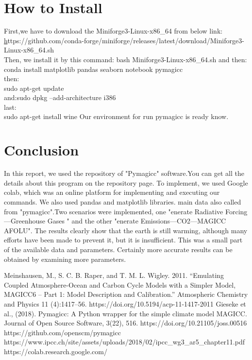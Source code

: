 \documentclass{article}
\begin{document}
\section{How to Install}
First,we have to download the Miniforge3-Linux-x86\_64 from below link:\\

\href{https://github.com/conda-forge/miniforge/releases/latest/download/Miniforge3-Linux-x86_64.sh}https://github.com/conda-forge/miniforge/releases/latest/download/Miniforge3-Linux-x86\_64.sh\\

Then, we install it by this command: 
bash Miniforge3-Linux-x86\_64.sh  and then:\\

conda install matplotlib pandas seaborn notebook pymagicc\\

then:\\

sudo apt-get update \\

and:sudo dpkg --add-architecture i386\\

 last:\\
 sudo apt-get install wine
 Our environment for run pymagicc is ready know.\\
\vspace{1cm} 
\section{Conclusion}
In this report, we used the repository of "Pymagicc" software\cite{3}.You can get all the details about this program on the repository page. To implement, we used Google colab\cite{5}, which was an online platform for implementing and executing our commands. We also used pandas and matplotlib libraries. main data also called from "pymagicc".Two scenarios were implemented, one "enerate Radiative Forcing—Greenhouse Gases " and the other "enerate Emissions—CO2—MAGICC AFOLU". The results clearly show that the earth is still warming, although many efforts have been made to prevent it, but it is insufficient. This was a small part of the available data and parameters. Certainly more accurate results can be obtained by examining more parameters.

\vspace{0.5cm} 
\begin{thebibliography}{9}
Meinshausen, M., S. C. B. Raper, and T. M. L. Wigley. 2011. “Emulating Coupled
Atmosphere-Ocean and Carbon Cycle Models with a Simpler Model, MAGICC6 – Part 1:
Model Description and Calibration.” Atmospheric Chemistry and Physics 11 (4):1417–56.
https://doi.org/10.5194/acp-11-1417-2011
Gieseke et al., (2018). Pymagicc: A Python wrapper for the simple climate model MAGICC. Journal of Open Source Software, 3(22), 516.
https://doi.org/10.21105/joss.00516
https://github.com/openscm/pymagicc
https://www.ipcc.ch/site/assets/uploads/2018/02/ipcc_wg3_ar5_chapter11.pdf
https://colab.research.google.com/
 
\end{thebibliography}
\end{document}
